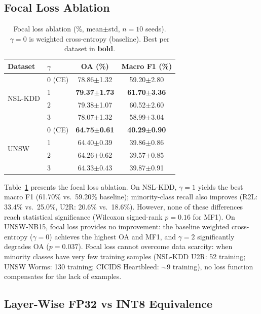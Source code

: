 \documentclass[10pt,twocolumn]{article}
\begin{document}
\subsection{Focal Loss Ablation}
\label{sec:focal}

\begin{table}[t]
\centering
\caption{Focal loss ablation (\%, mean$\pm$std, $n{=}10$ seeds). $\gamma{=}0$
is weighted cross-entropy (baseline). Best per dataset in \textbf{bold}.}
\label{tab:focal}
\small
\begin{tabular}{@{}llcc@{}}
\toprule
\textbf{Dataset} & $\gamma$ & \textbf{OA (\%)} & \textbf{Macro F1 (\%)} \\
\midrule
\multirow{4}{*}{NSL-KDD}
  & 0 (CE) & 78.86$\pm$1.32 & 59.20$\pm$2.80 \\
  & 1      & \textbf{79.37$\pm$1.73} & \textbf{61.70$\pm$3.36} \\
  & 2      & 79.38$\pm$1.07 & 60.52$\pm$2.60 \\
  & 3      & 78.07$\pm$1.32 & 58.99$\pm$3.04 \\
\midrule
\multirow{4}{*}{UNSW}
  & 0 (CE) & \textbf{64.75$\pm$0.61} & \textbf{40.29$\pm$0.90} \\
  & 1      & 64.40$\pm$0.39 & 39.86$\pm$0.86 \\
  & 2      & 64.26$\pm$0.62 & 39.57$\pm$0.85 \\
  & 3      & 64.33$\pm$0.43 & 39.87$\pm$0.91 \\
\bottomrule
\end{tabular}
\end{table}

Table~\ref{tab:focal} presents the focal loss ablation.
On NSL-KDD, $\gamma{=}1$ yields the best macro F1 (61.70\% vs.\
59.20\% baseline); minority-class recall also improves
(R2L: 33.4\% vs.\ 25.0\%, U2R: 20.6\% vs.\ 18.6\%).
However, none of these differences reach statistical significance
(Wilcoxon signed-rank $p{=}0.16$ for MF1).
On UNSW-NB15, focal loss provides no improvement: the baseline
weighted cross-entropy ($\gamma{=}0$) achieves the highest OA
and MF1, and $\gamma{=}2$ significantly degrades OA
($p{=}0.037$).
Focal loss cannot overcome data scarcity:
when minority classes have very few training samples
(NSL-KDD U2R: 52 training; UNSW Worms: 130 training; CICIDS Heartbleed: ${\sim}$9 training),
no loss function compensates for the lack of examples.

\subsection{Layer-Wise FP32 vs INT8 Equivalence}
\label{sec:layerwise}
\end{document}
